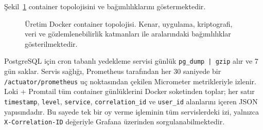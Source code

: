 \documentclass[a4paper,fleqn]{cas-sc}
\begin{document}
Şekil~\ref{fig:infra_topology} container topolojisini ve bağımlılıklarını
göstermektedir.

\begin{figure}[ht]
  \centering
  \fbox{\rule{0pt}{6cm}\rule{0.9\linewidth}{0pt}}
  \caption{Üretim Docker container topolojisi. Kenar, uygulama, kriptografi,
           veri ve gözlemlenebilirlik katmanları ile aralarındaki
           bağımlılıklar gösterilmektedir.}
  \label{fig:infra_topology}
\end{figure}

PostgreSQL için cron tabanlı yedekleme servisi günlük \texttt{pg\_dump
| gzip} alır ve 7 gün saklar.
Servis sağlığı, Prometheus tarafından her 30 saniyede bir
\texttt{/actuator/prometheus} uç noktasından çekilen Micrometer metrikleriyle
izlenir.
Loki + Promtail tüm container günlüklerini Docker soketinden toplar;
her satır \texttt{timestamp}, \texttt{level}, \texttt{service},
\texttt{correlation\_id} ve \texttt{user\_id} alanlarını içeren JSON
yapısındadır.
Bu sayede tek bir oy verme işleminin tüm servislerdeki izi, yalnızca
\texttt{X-Correlation-ID} değeriyle Grafana üzerinden sorgulanabilmektedir.


\end{document}
